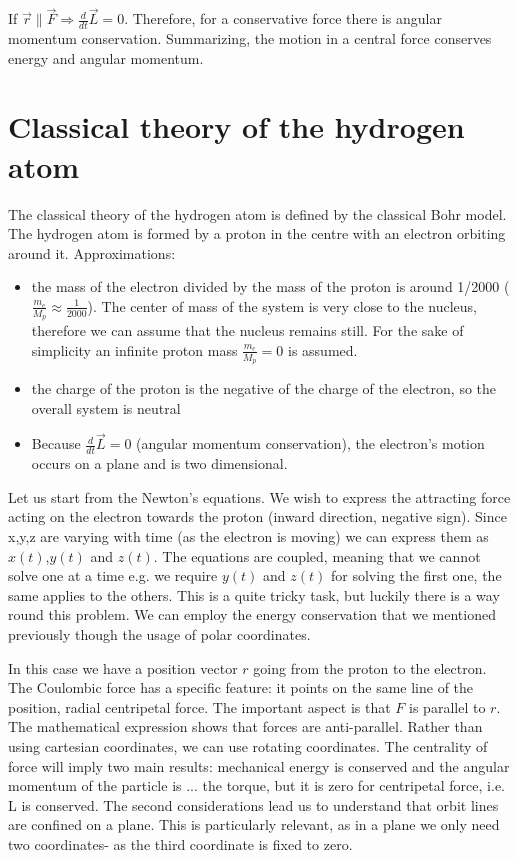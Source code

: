  If $\vec{r}\parallel \vec{F}\Rightarrow \frac{d{}}{d{t}}\vec{L} = 0$.
  Therefore, for a conservative force there is angular momentum conservation.
  Summarizing, the motion in a central force conserves energy and angular momentum.

\section{Classical theory of the hydrogen atom}
The classical theory of the hydrogen atom is defined by the classical Bohr model.
The hydrogen atom is formed by a proton in the centre with an electron orbiting around it.
Approximations:
\begin{itemize}
  \item the mass of the electron divided by the mass of the proton is around 1/2000 ($\frac{m_e}{M_p}\approx \frac{1}{2000}$). The center of mass of the system is very close to the nucleus, therefore we can assume that the nucleus remains still. For the sake of simplicity an infinite proton mass $\frac{m_e}{M_p}=0$ is assumed.
  \item the charge of the proton is the negative of the charge of the electron, so the overall system is neutral
  \item  Because $\frac{d{}}{d{t}}\vec{L}=0$ (angular momentum conservation), the electron's motion occurs on a plane and is two dimensional.
\end{itemize}
Let us start from the Newton's equations. We wish to express the attracting force acting on the electron towards the proton (inward direction, negative sign). Since x,y,z are varying with time (as the electron is moving) we can express them as $x(t)$,$y(t)$ and $z(t)$. The equations are coupled, meaning that we cannot solve one at a time e.g. we require $y(t)$ and $z(t)$ for solving the first one, the same applies to the others.
This is a quite tricky task, but luckily there is a way round this problem. We can employ the energy conservation that we mentioned previously though the usage of polar coordinates.

In this case we have a position vector $r$ going from the proton to the electron. The Coulombic force has a specific feature: it points on the same line of the position, radial centripetal force. The important aspect is that $F$ is parallel to $r$. The mathematical expression shows that forces are anti-parallel. Rather than using cartesian coordinates, we can use rotating coordinates. The centrality of force will imply two main results: mechanical energy is conserved and the angular momentum  of the particle is ... the torque, but it is zero for centripetal force, i.e. L is conserved.
The second considerations lead us to understand that orbit lines are confined on a plane. This is particularly relevant, as in a plane we only need two coordinates- as the third coordinate is fixed to zero.

